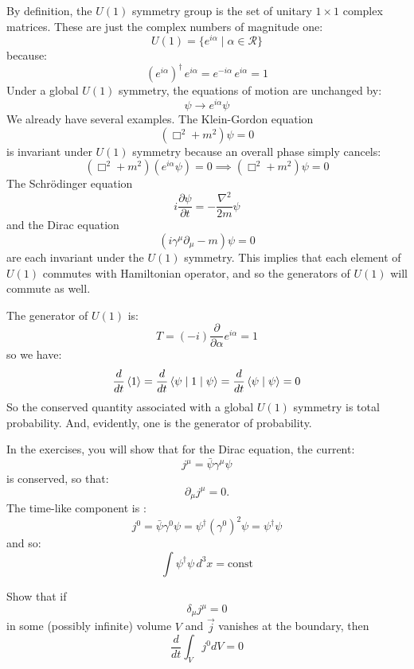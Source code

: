 \documentclass[12pt]{article}
\begin{document}
By definition, the $U(1)$ symmetry group is the set of unitary $1 \times 1$ complex
matrices.  These are just the complex numbers of magnitude
one:
$$U(1) = \{ e^{i\alpha} \mid \alpha \in \mathcal{R}\}$$
because:
$$\left(e^{i\alpha}\right)^\dagger\, e^{i\alpha} = e^{-i\alpha} \, e^{i\alpha} = 1$$
Under a global $U(1)$ symmetry, the equations of motion are unchanged
by:
$$\psi \to e^{i\alpha} \psi$$
We already have several examples.  The Klein-Gordon equation
\begin{equation}
\label{eqn:klein-gordan}
(\Box^2 + m^2)\psi = 0
\end{equation}
is invariant under $U(1)$ symmetry because an overall phase simply cancels:
\begin{equation*}
  (\Box^2 + m^2) \left(e^{i\alpha} \psi \right) = 0
  \implies
  (\Box^2 + m^2) \psi = 0
\end{equation*}
The Schr\"odinger equation
\begin{equation}
\label{eqn:schrodinger}
i\frac{\partial\psi}{\partial t} = -\frac{\nabla^2}{2m}\psi
\end{equation}
and the Dirac equation
\begin{equation}
\label{eqn:dirac}
(i\gamma^\mu\partial_\mu - m)\psi = 0
\end{equation}
are each invariant under the $U(1)$ symmetry.  This implies that each
element of $U(1)$ commutes with Hamiltonian operator, and so the
generators of $U(1)$ will commute as well.

The generator of $U(1)$ is:
$$T = (-i) \frac{\partial}{\partial \alpha} e^{i\alpha} = 1$$
so we have:
$$\frac{d}{dt}\braket{1} = \frac{d}{dt}\braket{\psi \mid 1 \mid \psi} =
\frac{d}{dt} \braket{\psi \mid \psi} = 0$$
So the conserved quantity associated with a global $U(1)$ symmetry is
total probability.  And, evidently, one is the generator of probability.

In the exercises, you will show that for the Dirac equation, the current:
\begin{equation}
\label{eqn:jmu-dirac}
j^\mu = \bar{\psi} \gamma^\mu \psi
\end{equation}
is conserved, so that:
\begin{equation}
\label{eqn:conserved-probability}
\partial_\mu j^\mu = 0.
\end{equation}
The time-like component is :
$$j^0 = \bar{\psi} \gamma^0 \psi = \psi^\dagger (\gamma^0)^2 \psi = \psi^\dagger \psi$$
and so:
$$\int \psi^\dagger \psi \, d^3x = \text{const}$$


\exercise Show that if
$$ \delta_\mu j^\mu = 0$$
in some (possibly infinite) volume $V$ and
$\vec{j}$ vanishes at the boundary, then
$$\frac{d}{dt} \int_V j^0 dV = 0$$
\end{document}
